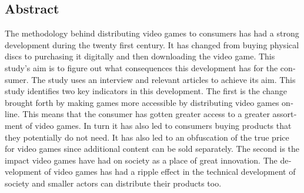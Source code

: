 \documentclass[11p]{article}
\begin{document}
    \begin{otherlanguage}{english}
    \tableofcontents

    \newpage

\setlength{\parskip}{10pt}

    \section{Abstract}

    The methodology behind distributing video games to consumers has had a strong development during the twenty first century.
    It has changed from buying physical discs to purchasing it digitally and then downloading the video game.
    This study's aim is to figure out what consequences this development has for the consumer.
    The study uses an interview and relevant articles to achieve its aim.
    This study identifies two key indicators in this development.
    The first is the change brought forth by making games more accessible by distributing video games online.
    This means that the consumer has gotten greater access to a greater assortment of video games.
    In turn it has also led to consumers buying products that they potentially do not need.
    It has also led to an obfuscation of the true price for video games since additional content can be sold separately.
    The second is the impact video games have had on society as a place of great innovation.
    The development of video games has had a ripple effect in the technical development of society and smaller actors can distribute their products too.
    \newpage
    \end{otherlanguage}
\end{document}
